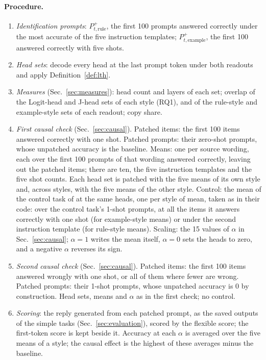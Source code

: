 \documentclass[11pt,a4paper]{article}
\begin{document}
\paragraph{Procedure.}
\begin{enumerate}
\item \emph{Identification prompts}: $P^{+}_{t,\text{rule}}$, the first 100 prompts answered correctly under the most accurate of the five instruction templates; $P^{+}_{t,\text{example}}$, the first 100 answered correctly with five shots.
\item \emph{Head sets}: decode every head at the last prompt token under both readouts and apply Definition~\ref{def:lth}.
\item \emph{Measures} (Sec.~\ref{sec:measures}): head count and layers of each set; overlap of the Logit-head and J-head sets of each style (RQ1), and of the rule-style and example-style sets of each readout; copy share.
\item \emph{First causal check} (Sec.~\ref{sec:causal}). Patched items: the first 100 items answered correctly with one shot. Patched prompts: their zero-shot prompts, whose unpatched accuracy is the baseline. Means: one per source wording, each over the first 100 prompts of that wording answered correctly, leaving out the patched items; there are ten, the five instruction templates and the five shot counts. Each head set is patched with the five means of its own style and, across styles, with the five means of the other style. Control: the mean of the control task of \citet{yang2026shared} at the same heads, one per style of mean, taken as in their code: over the control task's 1-shot prompts, at all the items it answers correctly with one shot (for example-style means) or under the second instruction template (for rule-style means). Scaling: the 15 values of $\alpha$ in Sec.~\ref{sec:causal}; $\alpha=1$ writes the mean itself, $\alpha=0$ sets the heads to zero, and a negative $\alpha$ reverses its sign.
\item \emph{Second causal check} (Sec.~\ref{sec:causal}). Patched items: the first 100 items answered wrongly with one shot, or all of them where fewer are wrong. Patched prompts: their 1-shot prompts, whose unpatched accuracy is 0 by construction. Head sets, means and $\alpha$ as in the first check; no control.
\item \emph{Scoring}: the reply generated from each patched prompt, as the saved outputs of the simple tasks (Sec.~\ref{sec:evaluation}), scored by the flexible score; the first-token score is kept beside it. Accuracy at each $\alpha$ is averaged over the five means of a style; the causal effect is the highest of these averages minus the baseline.
\end{enumerate}
\end{document}
